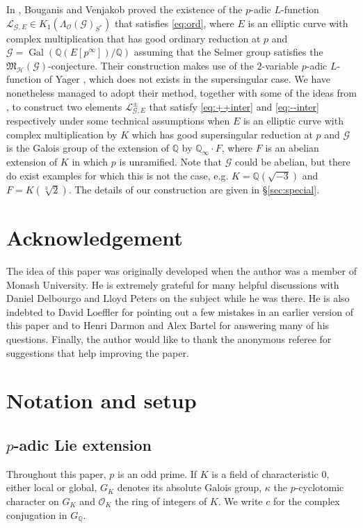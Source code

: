 \documentclass{amsart}
\begin{document}
In \cite{bv10}, Bouganis and Venjakob proved the existence of the $p$-adic $L$-function ${\mathcal{L}}_{{\mathcal{G}},E}\in K_1(\Lambda_{\mathcal{O}}({\mathcal{G}})_{S^*})$ that satisfies \eqref{eq:ord}, where $E$ is an elliptic curve with complex multiplication that has good ordinary reduction at $p$ and ${\mathcal{G}}=\operatorname{Gal}({\mathbb Q}(E[p^\infty])/{\mathbb Q})$ assuming that the Selmer group satisfies the ${\mathfrak{M}_{\mathcal{H}}({\mathcal{G}})}$-conjecture. Their construction makes use of the $2$-variable $p$-adic $L$-function of Yager \cite{yager82}, which does not exists in the supersingular case. We have nonetheless managed to adopt their method, together with some of the ideas from \cite{kimparkzhang}, to construct two elements ${\mathcal{L}}_{{\mathcal{G}},E}^\pm$ that satisfy \eqref{eq:++inter} and \eqref{eq:--inter} respectively under some technical assumptions when $E$ is an elliptic curve with complex multiplication by $K$ which has good supersingular reduction at $p$ and ${\mathcal{G}}$ is the Galois group of the extension of ${\mathbb Q}$ by ${\mathbb Q}_\infty\cdot F$, where $F$ is an abelian extension of $K$ in which $p$ is unramified. Note that ${\mathcal{G}}$ could be abelian, but there do exist examples for which this is not the case, e.g. $K={\mathbb Q}(\sqrt{-3})$ and $F=K(\sqrt[3]{2})$. The details of our construction are given in \S\ref{sec:special}.

\section*{Acknowledgement}
The idea of this paper was originally developed when the author was a member of Monash University. He is extremely grateful for many helpful discussions with Daniel Delbourgo and Lloyd Peters on the subject while he was there. He is also indebted to David Loeffler for pointing out a few mistakes in an earlier version of this paper and to Henri Darmon and Alex Bartel for answering many of his questions. Finally, the author would like to thank the anonymous referee for suggestions that help improving the paper.

\section{Notation and setup}\label{sec:no}

\subsection{$p$-adic Lie extension} \label{sec:paLe}
  Throughout this paper, $p$ is an odd prime. If $K$ is a field of characteristic $0$, either local or global, $G_K$ denotes its absolute Galois group, $\kappa$ the $p$-cyclotomic character on $G_K$ and ${\mathcal{O}}_K$ the ring of integers of $K$. We write $c$ for the complex conjugation in $G_{\mathbb Q}$.
\end{document}
